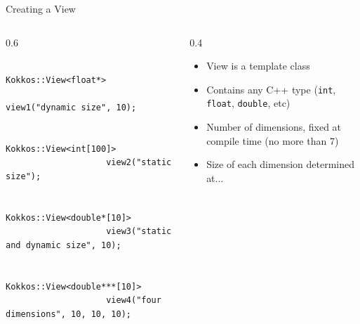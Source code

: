 \documentclass[
    aspectratio=169,
]{beamer}
\begin{document}
\begin{frame}[fragile]{Creating a View}
    \begin{columns}
        \begin{column}{0.6\linewidth}
            \begin{verbatim}
                Kokkos::View<float*>
                    view1("dynamic size", 10);

                Kokkos::View<int[100]>
                    view2("static size");

                Kokkos::View<double*[10]>
                    view3("static and dynamic size", 10);

                Kokkos::View<double***[10]>
                    view4("four dimensions", 10, 10, 10);
            \end{verbatim}
        \end{column}
        \begin{column}{0.4\linewidth}
            \begin{itemize}
                \item View is a template class
                \item Contains any C++ type (\texttt{int}, \texttt{float}, \texttt{double}, etc)
                \item Number of dimensions, fixed at compile time (no more than 7)
                \item Size of each dimension determined at...
            \end{itemize}
        \end{column}
    \end{columns}
\end{frame}
\end{document}
